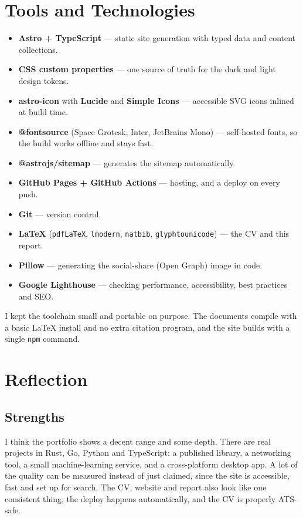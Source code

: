 \documentclass[11pt,a4paper]{article}
\begin{document}
\section{Tools and Technologies}
\label{sec:tools}
\begin{itemize}
\item \textbf{Astro + TypeScript} --- static site generation with typed data and content collections.
\item \textbf{CSS custom properties} --- one source of truth for the dark and light design tokens.
\item \textbf{astro-icon} with \textbf{Lucide} and \textbf{Simple Icons} --- accessible SVG icons inlined at build time.
\item \textbf{@fontsource} (Space Grotesk, Inter, JetBrains Mono) --- self-hosted fonts, so the build works offline and stays fast.
\item \textbf{@astrojs/sitemap} --- generates the sitemap automatically.
\item \textbf{GitHub Pages + GitHub Actions} --- hosting, and a deploy on every push.
\item \textbf{Git} --- version control.
\item \textbf{\LaTeX} (\texttt{pdfLaTeX}, \texttt{lmodern}, \texttt{natbib}, \texttt{glyphtounicode}) --- the CV and this report.
\item \textbf{Pillow} --- generating the social-share (Open Graph) image in code.
\item \textbf{Google Lighthouse} --- checking performance, accessibility, best practices and SEO.
\end{itemize}

I kept the toolchain small and portable on purpose. The documents compile with a basic \LaTeX{} install and no extra citation program, and the site builds with a single \texttt{npm} command.

\section{Reflection}
\label{sec:reflection}

\subsection{Strengths}
I think the portfolio shows a decent range and some depth. There are real projects in Rust, Go, Python and TypeScript: a published library, a networking tool, a small machine-learning service, and a cross-platform desktop app. A lot of the quality can be measured instead of just claimed, since the site is accessible, fast and set up for search. The CV, website and report also look like one consistent thing, the deploy happens automatically, and the CV is properly ATS-safe.
\end{document}

